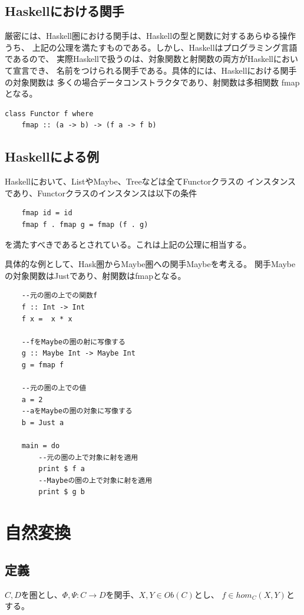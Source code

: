\documentclass{jsarticle}
\begin{document}
\subsection{Haskellにおける関手}
厳密には、Haskell圏における関手は、Haskellの型と関数に対するあらゆる操作うち、
上記の公理を満たすものである。しかし、Haskellはプログラミング言語であるので、
実際Haskellで扱うのは、対象関数と射関数の両方がHaskellにおいて宣言でき、
名前をつけられる関手である。具体的には、Haskellにおける関手の対象関数は
多くの場合データコンストラクタであり、射関数は多相関数 fmapとなる。

\begin{lstlisting}
class Functor f where
    fmap :: (a -> b) -> (f a -> f b)
\end{lstlisting}

\subsection{Haskellによる例}
Haskellにおいて、ListやMaybe、Treeなどは全てFunctorクラスの
インスタンスであり、Functorクラスのインスタンスは以下の条件
\begin{lstlisting}
    fmap id = id
    fmap f . fmap g = fmap (f . g)
\end{lstlisting}
を満たすべきであるとされている。これは上記の公理に相当する。

具体的な例として、Hask圏からMaybe圏への関手Maybeを考える。
関手Maybeの対象関数はJustであり、射関数はfmapとなる。
\begin{lstlisting}
    --元の圏の上での関数f
    f :: Int -> Int
    f x =  x * x

    --fをMaybeの圏の射に写像する
    g :: Maybe Int -> Maybe Int
    g = fmap f

    --元の圏の上での値
    a = 2
    --aをMaybeの圏の対象に写像する
    b = Just a

    main = do
        --元の圏の上で対象に射を適用
        print $ f a
        --Maybeの圏の上で対象に射を適用
        print $ g b
\end{lstlisting}


\newpage

\section{自然変換}
\subsection{定義}
$C, D$を圏とし、$\Phi,\Psi:C\to D$を関手、$X,Y\in Ob(C)$とし、
$f\in hom_C(X,Y)$とする。
\end{document}
